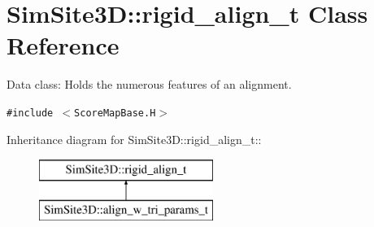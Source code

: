 \section{SimSite3D::rigid\_\-align\_\-t Class Reference}
\label{classSimSite3D_1_1rigid__align__t}
Data class: Holds the numerous features of an alignment.  


{\tt \#include $<$Score\-Map\-Base.H$>$}

Inheritance diagram for SimSite3D::rigid\_\-align\_\-t::\begin{figure}[H]
\begin{center}
\leavevmode
\includegraphics[height=2cm]{classSimSite3D_1_1rigid__align__t}
\end{center}
\end{figure}
